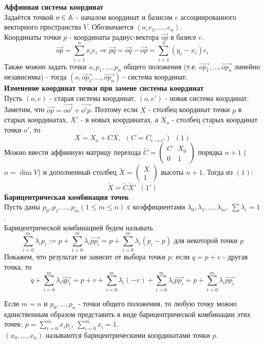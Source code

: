 \textbf{Аффинная система координат}\\
Задаётся точкой $o \in \mathbb{A}$ - началом координат и базисом $e$ ассоциированного векторного пространства $V$. Обозначается $(o, e_1,...,e_n)$.\\
Координаты точки $p$ - координаты радиус-вектора $\overrightarrow{op}$ в базисе $e$.
$$\overrightarrow{op} = \sum \limits_{i=1}^n x_ie_i \Longrightarrow \overrightarrow{pq} = \overrightarrow{oq} - \overrightarrow{op} = \sum \limits_{i=1}^n (y_i - x_i)e_i$$
Также можно задать точки $o, p_1,...,p_n$ общего положения (т.е. $\overrightarrow{op_1},...,\overrightarrow{op_n}$ линейно независимы) - тогда $(o, \overrightarrow{op_1},...,\overrightarrow{op_n})$ - система координат.\\
\textbf{Изменение координат точки при замене системы координат}\\
Пусть $(o, e)$ - старая система координат, $(o, e')$ - новая система координат.\\
Заметим, что $\overrightarrow{op} = \overrightarrow{oo'} + \overrightarrow{o'p}$. Поэтому если $X$ - столбец координат точки $p$ в старых координатах, $X'$ - в новых координатах, а $X_o$ - столбец старых координат точки $o'$, то $$X = X_o + CX, \ \ (C = C_{e\rightarrow e'}) \ \ (1)$$
Можно ввести аффинную матрицу перехода $\tilde{C} = \begin{pmatrix} C&X_0 \\ 0&1 \end{pmatrix}$ порядка $n + 1$ ($n = \dim V$) и дополненный столбец $\tilde{X} = \begin{pmatrix} X \\ 1 \end{pmatrix}$ высоты $n + 1$. Тогда из $(1)$:
$$\tilde{X} = \tilde{C}\tilde{X}' \ \ (1')$$
\textbf{Барицентрическая комбинация точек}\\
Пусть даны $p_0,p_1,...,p_m (1 \leqslant m \leqslant n)$ с коэффициентами $\lambda_0,\lambda_1,...,\lambda_m, \ \sum \lambda_i = 1$.\\
Барицентрической комбинацией будем называть 
$$\sum \limits_{i=0}^m \lambda_ip_i := p + \sum \limits_{i=0}^m \lambda_i \overrightarrow{pp_i} = p + \sum \limits_{i=0}^m \lambda_i(p_i - p)\text{ для некоторой точки } p$$
Покажем, что результат не зависит от выбора точки $p$: если $q = p + v$ - другая точка, то
$$q + \sum \limits_{i=0}^m \lambda_i \overrightarrow{qp_i} = p+ v + \sum \limits_{i=0}^m \lambda_i(-v) + \sum \limits_{i=0}^m \lambda_i \overrightarrow{pp_i} = p + \sum \limits_{i=0}^m \lambda_i \overrightarrow{pp_i}$$
\begin{consequense}
    Если $m = n$ и $p_0,...,p_n$ - точки общего положения, то любую точку можно единственным образом представить в виде барицентрической комбинации этих точек: $p = \sum \limits_{i=0}^m x_ip_i, \ \sum \limits_{i=0}^m x_i = 1$.\\
    $(x_0,...,x_n)$ называются барицентрическими координатами точки $p$.
\end{consequense}
